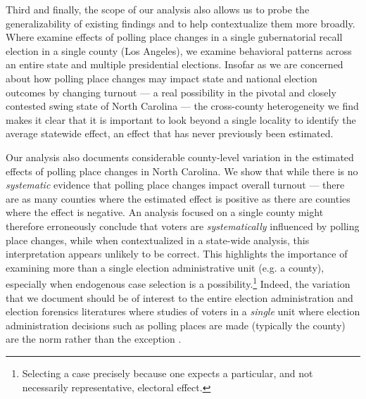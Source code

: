 \documentclass{cup_PSRM}
\begin{document}
Third and finally, the scope of our analysis also allows us to probe the generalizability of existing findings and to help contextualize them more broadly. Where \cite{brady2011turning} examine effects of polling place changes in a single gubernatorial recall election in a single county (Los Angeles), we examine behavioral patterns across an entire state and multiple presidential elections. Insofar as we are concerned about how polling place changes may impact state and national election outcomes by changing turnout --- a real possibility in the pivotal and closely contested swing state of North Carolina --- the cross-county heterogeneity we find makes it clear that it is important to look beyond a single locality to identify the average statewide effect, an effect that has never previously been estimated.

Our analysis also documents considerable county-level variation in the estimated effects of polling place changes in North Carolina. We show that while there is no \emph{systematic} evidence that polling place changes impact overall turnout --- there are as many counties where the estimated effect is positive as there are counties where the effect is negative. An analysis focused on a single county might therefore erroneously conclude that voters are \emph{systematically} influenced by polling place changes, while when contextualized in a state-wide analysis, this interpretation appears unlikely to be correct. This highlights the importance of examining more than a single election administrative unit (e.g. a county), especially when endogenous case selection is a possibility.\footnote{Selecting a case precisely because one expects a particular, and not necessarily representative, electoral effect.}  Indeed, the variation that we document should be of interest to the entire election administration and election forensics literatures where studies of voters in a \emph{single} unit where election administration decisions such as polling places are made (typically the county) are the norm rather than the exception \citep{dyck2005distance, gimpel2003political, haspel2005location, cantoni2016, amos2017reprecincting}.
\end{document}
